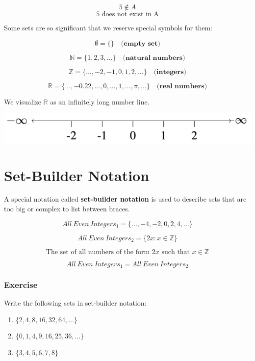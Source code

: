 \documentclass[
  letterpaper,
  DIV=11,
  numbers=noendperiod]{scrreprt}
\providecommand{\tightlist}{%
  \setlength{\itemsep}{0pt}\setlength{\parskip}{0pt}}\usepackage{longtable,booktabs,array}
\begin{document}
\[
5 \notin A
\] \[
\text{5 does not exist in A}
\]

Some sets are so significant that we reserve special symbols for them:

\[
\emptyset = \{\} \quad \textbf{(empty set)}
\]

\[
\mathbb{N} = \{1, 2, 3, ... \} \quad \textbf{(natural numbers)}
\]

\[
\mathbb{Z} = \{..., -2, -1, 0, 1, 2, ... \} \quad \textbf{(integers)}
\]

\[
\mathbb{R} = \{..., -0.22,...,0,...,1,..., \pi, ... \} \quad \textbf{(real numbers)}
\]

We visualize \(\mathbb{R}\) as an infinitely long number line.

\includegraphics[width=0.5\linewidth,height=\textheight,keepaspectratio]{lecture2/images/numberline.png}

\section{Set-Builder Notation}\label{set-builder-notation}

A special notation called \textbf{set-builder notation} is used to
describe sets that are too big or complex to list between braces.

\[
All\ Even\ Integers_{1} = \{..., -4, -2, 0, 2, 4, ...\}
\]

\[
All\ Even\ Integers_{2} = \{2x: x \in \mathbb{Z} \}
\]

\[
\text{The set of all numbers of the form } 2x \text{ such that } x \in \mathbb{Z}
\]

\[
All\ Even\ Integers_{1} = All\ Even\ Integers_{2}
\]

\subsubsection{Exercise}\label{exercise}

Write the following sets in set-builder notation:

\begin{enumerate}
\def\labelenumi{\arabic{enumi}.}
\tightlist
\item
  \(\{ 2, 4, 8, 16, 32, 64, ... \}\)
\item
  \(\{ 0, 1, 4, 9, 16, 25, 36, ... \}\)
\item
  \(\{ 3, 4, 5, 6, 7, 8 \}\)
\end{enumerate}
\end{document}
